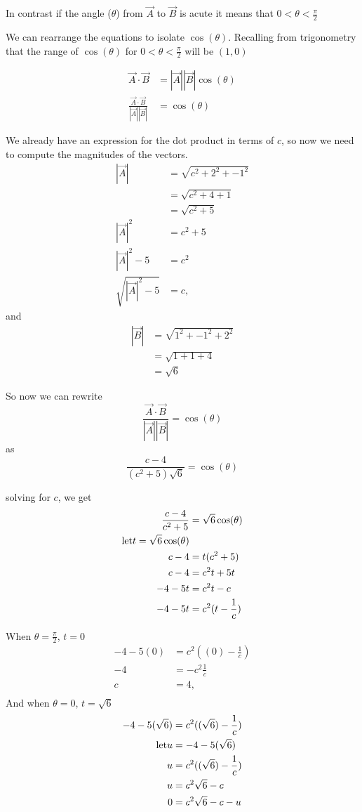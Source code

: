 \documentclass[main.tex]{subfiles}
\begin{document}
In contrast if the angle ($\theta$) from $\vec{A}$ to $\vec{B}$ is acute it 
means that $0 < \theta < \frac{\pi}{2}$

We can rearrange the equations to isolate $\cos(\theta)$. Recalling from 
trigonometry that the range of $\cos(\theta)$ for  
$0 < \theta < \frac{\pi}{2}$ will  be $(1, 0)$


\begin{align*}
\vec{A}\cdot\vec{B} &= |\vec{A}||\vec{B}|\cos(\theta)\\
\frac{\vec{A}\cdot\vec{B}}{|\vec{A}||\vec{B}|} &= \cos(\theta)
\end{align*}

We already have an expression for the dot product in terms of $c$, so now 
we need to compute the magnitudes of the vectors.
\begin{align*}
|\vec{A}| &= \sqrt{c^2 + 2^2 + -1^2}\\
          &= \sqrt{c^2 + 4 + 1}\\
          &= \sqrt{c^2 + 5}\\
|\vec{A}|^2 &= c^2 + 5\\
|\vec{A}|^2 - 5 &= c^2\\
\sqrt{|\vec{A}|^2 - 5} &= c,
\end{align*}
and
\begin{align*}
|\vec{B}| &= \sqrt{1^2 + -1^2 + 2^2}\\
          &= \sqrt{1 + 1 + 4}\\
          &= \sqrt6
\end{align*}

So now we can rewrite
\[
\frac{\vec{A}\cdot\vec{B}}{|\vec{A}||\vec{B}|} = \cos(\theta)
\]
as
\[
\frac{c-4}{(c^2 + 5)  \sqrt{6}} = \cos(\theta)
\]

solving for $c$, we get
\begin{align*}
\frac{c-4}{c^2 + 5} &= \sqrt{6} \cos(\theta)\\
\text{let}\space t = \sqrt{6} \cos(\theta)\\
c-4 &= t (c^2 + 5)\\
c-4 &=  c^2t + 5 t\\
-4 - 5 t &=  c^2t  - c\\
-4 - 5 t &=  c^2(t  - \frac{1}{c})\\
\end{align*}

When $\theta = \frac{\pi}{2}$, $t = 0$
\begin{align*}
-4 - 5 (0) &=  c^2((0)  - \frac{1}{c})\\
-4 &=   - c^2 \frac{1}{c}\\
c &= 4,\\
\end{align*}
And when $\theta = 0$, $t = \sqrt{6}$
\begin{align*}
-4 - 5 (\sqrt{6}) &=  c^2((\sqrt{6})  - \frac{1}{c})\\
\text{let}\space u &= -4 - 5 (\sqrt{6})\\
u &=  c^2((\sqrt{6})  - \frac{1}{c})\\
u &=  c^2\sqrt{6}  - c\\
0 &=  c^2\sqrt{6}  - c - u\\
\end{align*}
\end{document}
